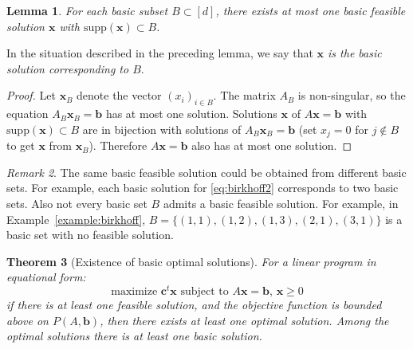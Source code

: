 \documentclass{amsbook}
\newcommand{\xx}{\mathbf x}
\newcommand{\cc}{\mathbf c}
\newcommand{\bb}{\mathbf b}
\newcommand{\supp}{\mathrm{supp}}
\newtheorem{theorem}{Theorem}[section]
\newtheorem{lemma}[theorem]{Lemma}
\theoremstyle{definition}
\theoremstyle{remark}
\newtheorem{remark}[theorem]{Remark}
\begin{document}
\begin{lemma}
  \label{lemma:unique-for-B}
  For each basic subset $B\subset [d]$, there exists at most one basic feasible solution $\xx$ with $\supp(\xx)\subset B$.
\end{lemma}
In the situation described in the preceding lemma, we say that \emph{$\xx$ is the basic solution corresponding to $B$}.
\begin{proof}
  Let $\xx_B$ denote the vector $(x_i)_{i\in B}$.
  The matrix $A_B$ is non-singular, so the equation $A_B\xx_B=\bb$ has at most one solution.
  Solutions $\xx$ of $A\xx=\bb$ with $\supp(\xx)\subset B$ are in bijection with solutions of $A_B\xx_B=\bb$ (set $x_j=0$ for $j\notin B$ to get $\xx$ from $\xx_B$).
  Therefore $A\xx=\bb$ also has at most one solution.
\end{proof}
\begin{remark}
  The same basic feasible solution could be obtained from different basic sets.
  For example, each basic solution for \eqref{eq:birkhoff2} corresponds to two basic sets.
  Also not every basic set $B$ admits a basic feasible solution.
  For example, in Example~\ref{example:birkhoff}, $B=\{(1,1),(1,2),(1,3),(2,1),(3,1)\}$ is a basic set with no feasible solution.
\end{remark}
\begin{theorem}
  [Existence of basic optimal solutions]
  \label{theorem:existence-of-basic-solutions}
  For a linear program in equational form:
  \begin{displaymath}
    \text{maximize $\cc^t\xx$ subject to $A\xx=\bb$, $\xx\geq 0$}
  \end{displaymath}
  if there is at least one feasible solution, and the objective function is bounded above on $P(A,\bb)$, then there exists at least one optimal solution.
  Among the optimal solutions there is at least one basic solution.
\end{theorem}
\end{document}
